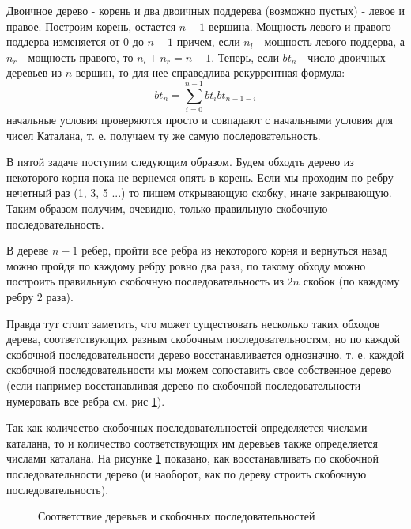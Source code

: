 \documentclass[a4paper,12pt]{article}
\begin{document}
\begin{Solution}
Двоичное дерево - корень и два двоичных поддерева (возможно пустых) - левое и правое. Построим корень, остается $n-1$ вершина. Мощность левого и правого поддерва изменяется от $0$ до $n-1$ причем, если $n_l$ - мощность левого поддерва, а $n_r$ - мощность правого, то $n_l + n_r = n-1$. Теперь, если $bt_n$ - число двоичных деревьев из $n$ вершин, то для нее справедлива рекуррентная формула:
\[
	bt_n = \sum_{i=0}^{n-1} bt_i bt_{n-1-i}
\]
начальные условия проверяются просто и совпадают с начальными условия для чисел Каталана, т. е. получаем ту же самую последовательность.

В пятой задаче поступим следующим образом. Будем обходть дерево из некоторого корня пока не вернемся опять в корень. Если мы проходим по ребру нечетный раз (1, 3, 5 ...) то пишем открывающую скобку, иначе закрывающую. Таким образом получим, очевидно, только правильную скобочную последовательность.

В дереве $n-1$ ребер, пройти все ребра из некоторого корня и вернуться назад можно пройдя по каждому ребру ровно два раза, по такому обходу можно построить правильную скобочную последовательность из $2n$ скобок (по каждому ребру 2 раза).

Правда тут стоит заметить, что может существовать несколько таких обходов дерева, соответствующих разным скобочным последовательностям, но по каждой скобочной последовательности дерево восстанавливается однозначно, т. е. каждой скобочной последовательности мы можем сопоставить свое собственное дерево (если например восстанавливая дерево по скобочной последовательности нумеровать все ребра см. рис \ref{img::treetrav}).

Так как количество скобочных последовательностей определяется числами каталана, то и количество соответствующих им деревьев также определяется числами каталана. На рисунке \ref{img::treetrav} показано, как восстанавливать по скобочной последовательности дерево (и наоборот, как по дереву строить скобочную последовательность).

\begin{figure}[h]
\caption{Соответствие деревьев и скобочных последовательностей}
\label{img::treetrav}
\end{figure}


\end{Solution}
\end{document}
